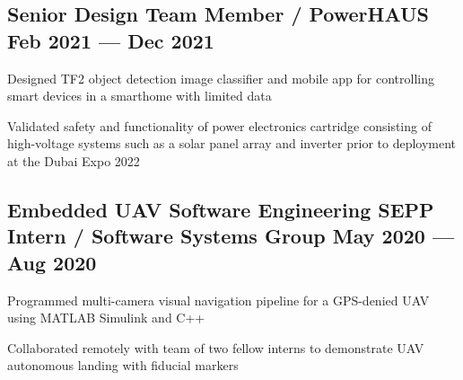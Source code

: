 \subsection{{Senior Design Team Member / PowerHAUS \hfill Feb 2021 --- Dec 2021}}
\begin{zitemize}
	\item Designed TF2 object detection image classifier and mobile app for controlling smart devices in a smarthome
	with limited data
	\item Validated safety and functionality of power electronics cartridge consisting of high-voltage systems such as a solar panel array and inverter prior to
	deployment at the Dubai Expo 2022
\end{zitemize}


\subsection{{Embedded UAV Software Engineering SEPP Intern / Software Systems Group  \hfill May 2020 --- Aug 2020}}
\begin{zitemize}
	\item Programmed multi-camera visual navigation pipeline for a GPS-denied UAV using MATLAB Simulink and C++
	\item Collaborated remotely with team of two fellow interns to demonstrate UAV autonomous landing with fiducial
	markers
\end{zitemize}

